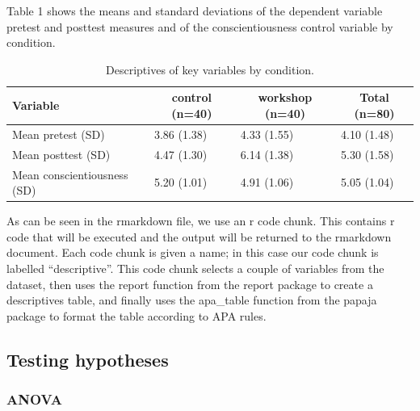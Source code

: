\documentclass[
  man]{apa6}
\begin{document}
Table 1 shows the means and standard deviations of the dependent variable pretest and posttest measures and of the conscientiousness control variable by condition.

\begin{table}[tbp]

\begin{center}
\begin{threeparttable}

\caption{\label{tab:descriptive}Descriptives of key variables by condition.}

\begin{tabular}{llll}
\toprule
Variable & \multicolumn{1}{c}{control (n=40)} & \multicolumn{1}{c}{workshop (n=40)} & \multicolumn{1}{c}{Total (n=80)}\\
\midrule
Mean pretest (SD) & 3.86 (1.38) & 4.33 (1.55) & 4.10 (1.48)\\
Mean posttest (SD) & 4.47 (1.30) & 6.14 (1.38) & 5.30 (1.58)\\
Mean conscientiousness (SD) & 5.20 (1.01) & 4.91 (1.06) & 5.05 (1.04)\\
\bottomrule
\end{tabular}

\end{threeparttable}
\end{center}

\end{table}

As can be seen in the rmarkdown file, we use an r code chunk.
This contains r code that will be executed and the output will be returned to the rmarkdown document.
Each code chunk is given a name; in this case our code chunk is labelled ``descriptive''.
This code chunk selects a couple of variables from the dataset, then uses the report function from the report package to create a descriptives table, and finally uses the apa\_table function from the papaja package to format the table according to APA rules.

\hypertarget{testing-hypotheses}{%
\subsection{Testing hypotheses}\label{testing-hypotheses}}

\hypertarget{anova}{%
\subsubsection{ANOVA}\label{anova}}
\end{document}
